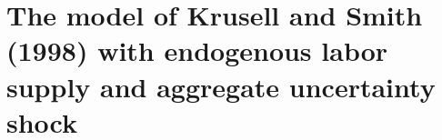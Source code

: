 \documentclass[12pt]{article}
\begin{document}
\small\normalsize%
\doublespace

\clearpage
\section*{The model of Krusell and Smith (1998) with endogenous labor supply and aggregate uncertainty shock}

\end{document}
